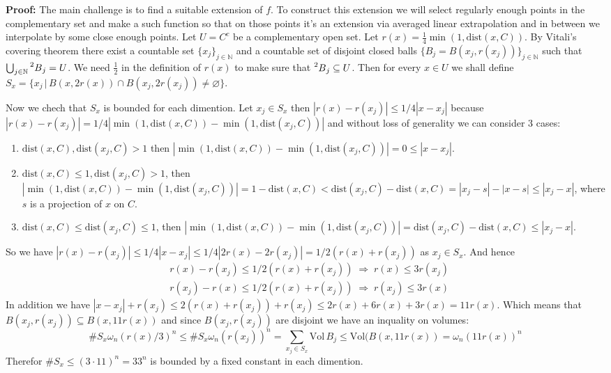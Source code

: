 \documentclass{article}
\begin{document}
\vspace{1ex}
\textbf{Proof:}
The main challenge is to find a suitable extension of $f$. To construct this
extension we will select regularly enough points in the complementary set and
make a such function so that on those points it's an extension via averaged linear extrapolation and in
between we interpolate by some close enough points. Let $U=C^c$ be a complementary
open set. Let $r(x)=\frac{1}{4}\min(1,\text{dist}(x,C))$.
By Vitali's covering theorem there exist a countable set
$\{x_j\}_{j\in\mathbb{N}}$ and a countable set of disjoint closed balls $\{B_j=B(x_j, r(x_j))\}_
{j\in\mathbb{N}}$ such that $\bigcup_{j\in\mathbb{N}}\prescript{2}{}B_j=U$. We
need $\frac{1}{2}$ in the definition of $r(x)$ to make sure that $\prescript{2}{}
B_j\subseteq U$. Then for every $x\in U$ we shall define $S_x=\{x_j\,|\,B(x,2r(x))
\cap B(x_j,2r(x_j))\neq\varnothing\}$. 

\vspace{1ex}
Now we chech that $S_x$ is bounded for each dimention.
Let $x_j\in S_x$ then $|r(x)-r(x_j)| \leq 1/4|x-x_j|$ because $|r(x)-r(x_j)|=
1/4|\min(1,\text{dist}(x,C))-\min(1,\text{dist}(x_j,C))|$ and without loss of
generality we can consider 3 cases:
\begin{enumerate}
    \item $\text{dist}(x,C),\text{dist}(x_j,C)>1$ then $|\min(1,\text{dist}(x,C))
        -\min(1,\text{dist}(x_j,C))|=0\leq|x-x_j|$.
    \item $\text{dist}(x,C)\leq1,\text{dist}(x_j,C)>1$, then $|\min(1,\text{dist}
        (x,C))-\min(1,\text{dist}(x_j,C))| = 1-\text{dist}(x,C)<\text{dist}(x_j,C)
        -\text{dist}(x,C)=|x_j-s|-|x-s|\leq|x_j-x|$, where $s$ is a projection
        of $x$ on $C$. 
    \item $\text{dist}(x,C)\leq\text{dist}(x_j,C)\leq1$, then $|\min(1,\text{dist}
        (x,C))-\min(1,\text{dist}(x_j,C))| = \text{dist}(x_j,C)-\text{dist}(x,C)
        \leq|x_j-x|$.
\end{enumerate}

So we have $|r(x)-r(x_j)| \leq 1/4|x-x_j|\leq1/4|2r(x)-2r(x_j)|=1/2(r(x)+r(x_j))$
as $x_j\in S_x$. And hence
\[
\begin{aligned}
    &r(x)-r(x_j)\leq1/2(r(x)+r(x_j))\;\Rightarrow\;r(x)\leq 3r(x_j)\\
    &r(x_j)-r(x)\leq1/2(r(x)+r(x_j))\;\Rightarrow\;r(x_j)\leq 3r(x)
\end{aligned}
\]
In addition we have $|x-x_j|+r(x_j)\leq2(r(x)+r(x_j))+r(x_j)\leq2r(x)+6r(x)+3r(x)=
11r(x)$. Which means that $B(x_j, r(x_j))\subseteq B(x, 11r(x))$ and since
$B(x_j, r(x_j))$ are disjoint we have an inquality on volumes:
\[
    \#S_x\omega_n(r(x)/3)^n\leq\#S_x\omega_n(r(x_j))^n=\sum_{x_j\in S_x}\text{Vol}
    \,B_j\leq\text{Vol}(B(x,11r(x))=\omega_n(11r(x))^n
\]
Therefor $\#S_x\leq(3\cdot11)^n=33^n$ is bounded by a fixed constant in each
dimention.
\end{document}
